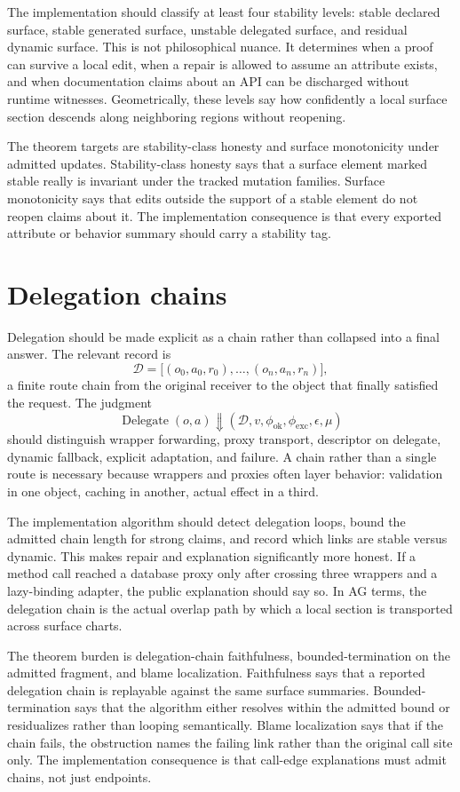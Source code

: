 \documentclass[11pt]{report}
\begin{document}
The implementation should classify at least four stability levels: stable declared surface, stable generated surface, unstable delegated surface, and residual dynamic surface. This is not philosophical nuance. It determines when a proof can survive a local edit, when a repair is allowed to assume an attribute exists, and when documentation claims about an API can be discharged without runtime witnesses. Geometrically, these levels say how confidently a local surface section descends along neighboring regions without reopening.

The theorem targets are stability-class honesty and surface monotonicity under admitted updates. Stability-class honesty says that a surface element marked stable really is invariant under the tracked mutation families. Surface monotonicity says that edits outside the support of a stable element do not reopen claims about it. The implementation consequence is that every exported attribute or behavior summary should carry a stability tag.
\section{Delegation chains}
Delegation should be made explicit as a chain rather than collapsed into a final answer. The relevant record is
\[
\mathcal{D} = \bigl[(o_0,a_0,r_0),\ldots,(o_n,a_n,r_n)\bigr],
\]
a finite route chain from the original receiver to the object that finally satisfied the request. The judgment
\[
\operatorname{Delegate}(o,a) \Downarrow (\mathcal{D},v,\phi_{\mathrm{ok}},\phi_{\mathrm{exc}},\epsilon,\mu)
\]
should distinguish wrapper forwarding, proxy transport, descriptor on delegate, dynamic fallback, explicit adaptation, and failure. A chain rather than a single route is necessary because wrappers and proxies often layer behavior: validation in one object, caching in another, actual effect in a third.

The implementation algorithm should detect delegation loops, bound the admitted chain length for strong claims, and record which links are stable versus dynamic. This makes repair and explanation significantly more honest. If a method call reached a database proxy only after crossing three wrappers and a lazy-binding adapter, the public explanation should say so. In AG terms, the delegation chain is the actual overlap path by which a local section is transported across surface charts.

The theorem burden is delegation-chain faithfulness, bounded-termination on the admitted fragment, and blame localization. Faithfulness says that a reported delegation chain is replayable against the same surface summaries. Bounded-termination says that the algorithm either resolves within the admitted bound or residualizes rather than looping semantically. Blame localization says that if the chain fails, the obstruction names the failing link rather than the original call site only. The implementation consequence is that call-edge explanations must admit chains, not just endpoints.
\end{document}
